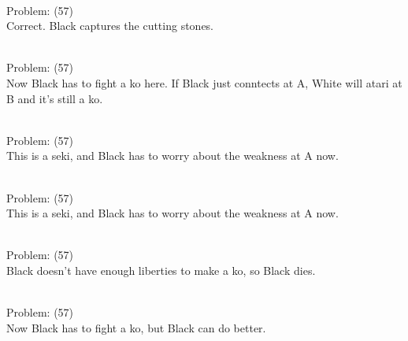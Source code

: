 \documentclass[11pt]{article}
\begin{document}
\begin{minipage}[t]{0.5\textwidth}
  {\centering
  
\\
Problem: (57)\\
Correct. Black captures the cutting stones.\\
  }
\end{minipage}
\begin{minipage}[t]{0.5\textwidth}
  {\centering
  
\\
Problem: (57)\\
Now Black has to fight a ko here. If Black just conntects at A, White will atari at B and it's still a ko.\\
  }
\end{minipage}
\begin{minipage}[t]{0.5\textwidth}
  {\centering
  
\\
Problem: (57)\\
This is a seki, and Black has to worry about the weakness at A now.\\
  }
\end{minipage}
\begin{minipage}[t]{0.5\textwidth}
  {\centering
  
\\
Problem: (57)\\
This is a seki, and Black has to worry about the weakness at A now.\\
  }
\end{minipage}
\begin{minipage}[t]{0.5\textwidth}
  {\centering
  
\\
Problem: (57)\\
Black doesn't have enough liberties to make a ko, so Black dies.\\
  }
\end{minipage}
\begin{minipage}[t]{0.5\textwidth}
  {\centering
  
\\
Problem: (57)\\
Now Black has to fight a ko, but Black can do better.\\
  }
\end{minipage}
\end{document}
